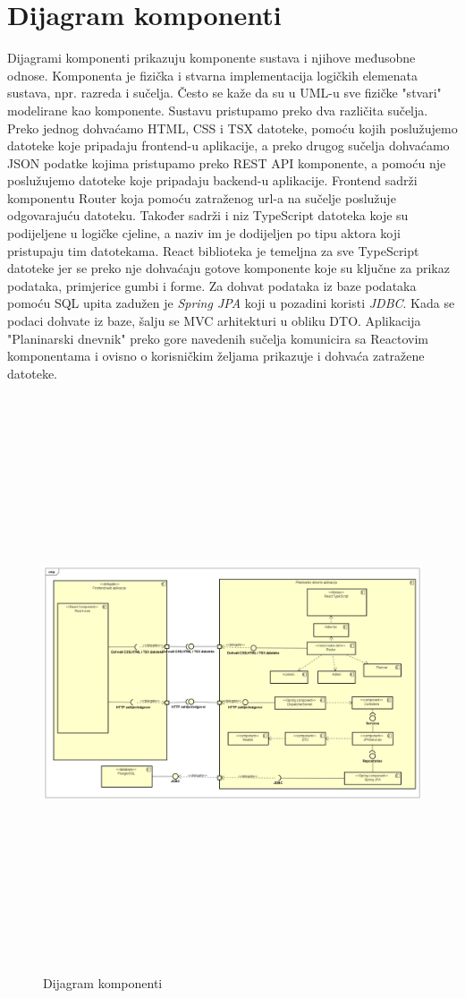 			\section{Dijagram komponenti}
		Dijagrami komponenti prikazuju komponente sustava i njihove međusobne odnose. Komponenta je fizička i stvarna implementacija logičkih elemenata sustava, npr. razreda i sučelja. Često se kaže da su u UML-u sve fizičke "stvari" modelirane kao komponente. Sustavu pristupamo preko dva različita sučelja. Preko jednog dohvaćamo HTML, CSS i TSX datoteke, pomoću kojih poslužujemo datoteke koje pripadaju frontend-u aplikacije, a preko drugog sučelja dohvaćamo JSON podatke kojima pristupamo preko REST API komponente, a pomoću nje poslužujemo datoteke koje pripadaju backend-u aplikacije. Frontend sadrži komponentu Router koja pomoću zatraženog url-a na sučelje poslužuje odgovarajuću datoteku. Također sadrži i niz TypeScript datoteka koje su podijeljene u logičke cjeline, a naziv im je dodijeljen po tipu aktora koji pristupaju tim datotekama. React biblioteka je temeljna za sve TypeScript datoteke jer se preko nje dohvaćaju gotove komponente koje su ključne za prikaz podataka, primjerice gumbi i forme. Za dohvat podataka iz baze podataka pomoću SQL upita zadužen je \textit{Spring JPA} koji u pozadini koristi \textit{JDBC}. Kada se podaci dohvate iz baze, šalju se MVC arhitekturi u obliku DTO. Aplikacija "Planinarski dnevnik" preko gore navedenih sučelja komunicira sa Reactovim komponentama i ovisno o korisničkim željama prikazuje i dohvaća zatražene datoteke.
		
		\begin{figure}[H]
			\includegraphics[scale=0.4, height=170mm, width=165mm]{dijagrami/dijagram-komponenti.png} %
			\centering
			\caption{Dijagram komponenti}
			\label{fig:dijagrami-komponenti.png}
		\end{figure}
		
		\eject